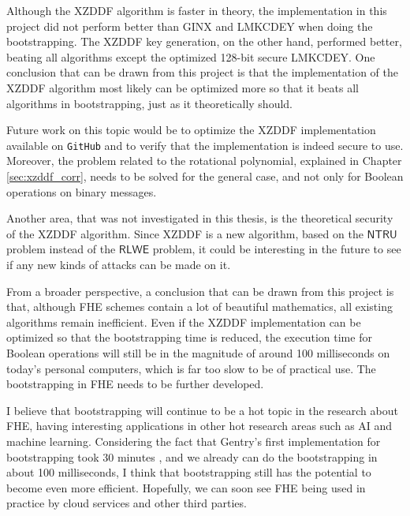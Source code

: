 Although the XZDDF algorithm is faster in theory, the implementation in this project did not perform better than GINX and LMKCDEY when doing the bootstrapping. The XZDDF key generation, on the other hand, performed better, beating all algorithms except the optimized 128-bit secure LMKCDEY. One conclusion that can be drawn from this project is that the implementation of the XZDDF algorithm most likely can be optimized more so that it beats all algorithms in bootstrapping, just as it theoretically should.

Future work on this topic would be to optimize the XZDDF implementation available on \texttt{GitHub} and to verify that the implementation is indeed secure to use. Moreover, the problem related to the rotational polynomial, explained in Chapter \ref{sec:xzddf_corr}, needs to be solved for the general case, and not only for Boolean operations on binary messages.

Another area, that was not investigated in this thesis, is the theoretical security of the XZDDF algorithm. Since XZDDF is a new algorithm, based on the $\mathsf{NTRU}$ problem instead of the $\mathsf{RLWE}$ problem, it could be interesting in the future to see if any new kinds of attacks can be made on it.

From a broader perspective, a conclusion that can be drawn from this project is that, although FHE schemes contain a lot of beautiful mathematics, all existing algorithms remain inefficient. Even if the XZDDF implementation can be optimized so that the bootstrapping time is reduced, the execution time for Boolean operations will still be in the magnitude of around 100 milliseconds on today's personal computers, which is far too slow to be of practical use. The bootstrapping in FHE needs to be further developed.

I believe that bootstrapping will continue to be a hot topic in the research about FHE, having interesting applications in other hot research areas such as AI and machine learning. Considering the fact that Gentry's first implementation for bootstrapping took 30 minutes \cite{cite:gentry_impl}, and we already can do the bootstrapping in about 100 milliseconds, I think that bootstrapping still has the potential to become even more efficient. Hopefully, we can soon see FHE being used in practice by cloud services and other third parties.








